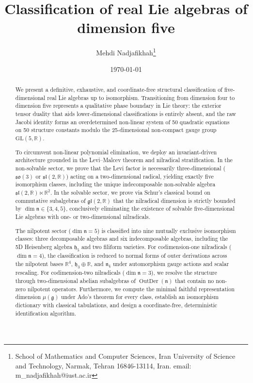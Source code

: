 \documentclass[11pt,a4paper]{article}
\title{\textbf{Classification of real Lie algebras of dimension five}}
\author{Mehdi Nadjafikhah\thanks{School of Mathematics and Computer Sciences, Iran University of Science and Technology, Narmak, Tehran 16846-13114, Iran. email: m\_nadjafikhah@iust.ac.ir}}
\date{\today}
\theoremstyle{definition}
\theoremstyle{remark}
\newcommand{\R}{\mathbb{R}}
\newcommand{\g}{\mathfrak{g}}
\newcommand{\n}{\mathfrak{n}}
\newcommand{\hh}{\mathfrak{h}}
\newcommand{\OutDer}{\operatorname{OutDer}}
\begin{document}
\maketitle

\begin{abstract}
We present a definitive, exhaustive, and coordinate-free structural classification of five-dimensional real Lie algebras up to isomorphism. Transitioning from dimension four to dimension five represents a qualitative phase boundary in Lie theory: the exterior tensor duality that aids lower-dimensional classifications is entirely absent, and the raw Jacobi identity forms an overdetermined non-linear system of 50 quadratic equations on 50 structure constants modulo the 25-dimensional non-compact gauge group $\mathrm{GL}(5,\R)$.

To circumvent non-linear polynomial elimination, we deploy an invariant-driven architecture grounded in the Levi--Malcev theorem and nilradical stratification. In the non-solvable sector, we prove that the Levi factor is necessarily three-dimensional ($\mathfrak{so}(3)$ or $\mathfrak{sl}(2,\R)$) acting on a two-dimensional radical, yielding exactly five isomorphism classes, including the unique indecomposable non-solvable algebra $\mathfrak{sl}(2,\R) \ltimes \R^2$. In the solvable sector, we prove via Schur's classical bound on commutative subalgebras of $\mathfrak{gl}(2,\R)$ that the nilradical dimension is strictly bounded by $\dim \n \in \{3, 4, 5\}$, conclusively eliminating the existence of solvable five-dimensional Lie algebras with one- or two-dimensional nilradicals.

The nilpotent sector ($\dim \n = 5$) is classified into nine mutually exclusive isomorphism classes: three decomposable algebras and six indecomposable algebras, including the 5D Heisenberg algebra $\hh_5$ and two filiform varieties. For codimension-one nilradicals ($\dim \n = 4$), the classification is reduced to normal forms of outer derivations across the nilpotent bases $\R^4$, $\hh_3 \oplus \R$, and $\mathfrak{n}_4$ under automorphism gauge actions and scalar rescaling. For codimension-two nilradicals ($\dim \n = 3$), we resolve the structure through two-dimensional abelian subalgebras of $\OutDer(\n)$ that contain no non-zero nilpotent operators. Furthermore, we compute the minimal faithful representation dimension $\mu(\g)$ under Ado's theorem for every class, establish an isomorphism dictionary with classical tabulations, and design a coordinate-free, deterministic identification algorithm.
\end{abstract}
\end{document}
